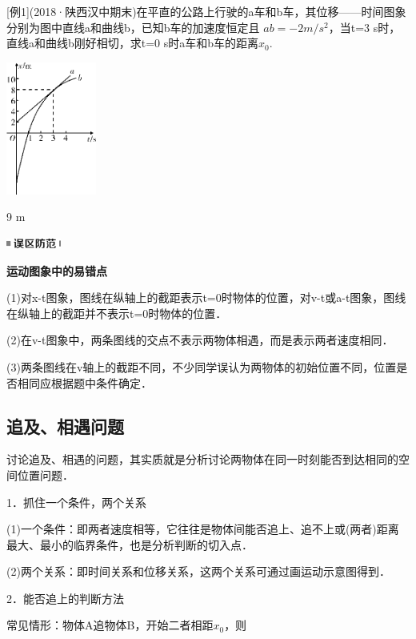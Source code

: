 \documentclass[cn,10.5pt,chinese,mac,chinesefont=founder]{elegantbook}
\begin{document}
{[}例1{]}(2018·陕西汉中期末)在平直的公路上行驶的a车和b车，其位移——时间图象分别为图中直线a和曲线b，已知b车的加速度恒定且
$ab=-2m/s^2$，当t=3 s时，直线a和曲线b刚好相切，求t=0 s时a车和b车的距离$x_0$.

\begin{center}\includegraphics[width=1.16667in,height=1.71875in]{media/image33.png}\end{center}

\begin{solution}
	9 m
\end{solution}
\begin{center}\includegraphics[width=0.70833in,height=0.125in]{media/image34.png}

\textbf{运动图象中的易错点}
\end{center}


(1)对x-t图象，图线在纵轴上的截距表示t=0时物体的位置，对v-t或a-t图象，图线在纵轴上的截距并不表示t=0时物体的位置．

(2)在v-t图象中，两条图线的交点不表示两物体相遇，而是表示两者速度相同．

(3)两条图线在v轴上的截距不同，不少同学误认为两物体的初始位置不同，位置是否相同应根据题中条件确定．
\newpage
\subsection{追及、相遇问题}

讨论追及、相遇的问题，其实质就是分析讨论两物体在同一时刻能否到达相同的空间位置问题．

1．抓住一个条件，两个关系

(1)一个条件：即两者速度相等，它往往是物体间能否追上、追不上或(两者)距离最大、最小的临界条件，也是分析判断的切入点．

(2)两个关系：即时间关系和位移关系，这两个关系可通过画运动示意图得到．

2．能否追上的判断方法

常见情形：物体A追物体B，开始二者相距$x_0$，则
\end{document}
